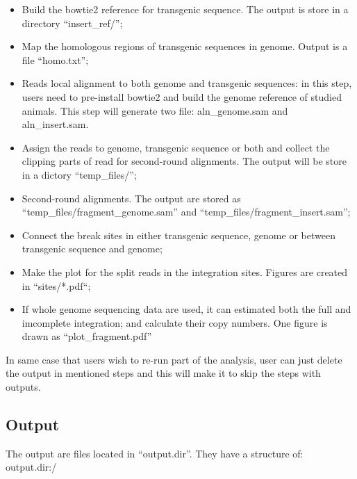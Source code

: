 \documentclass[]{article}
\begin{document}
\begin{itemize}
\item
  Build the bowtie2 reference for transgenic sequence. The output is
  store in a directory ``insert\_ref/'';
\item
  Map the homologous regions of transgenic sequences in genome. Output
  is a file ``homo.txt'';
\item
  Reads local alignment to both genome and transgenic sequences: in this
  step, users need to pre-install bowtie2 and build the genome reference
  of studied animals. This step will generate two file: aln\_genome.sam
  and aln\_insert.sam.
\item
  Assign the reads to genome, transgenic sequence or both and collect
  the clipping parts of read for second-round alignments. The output
  will be store in a dictory ``temp\_files/'';
\item
  Second-round alignments. The output are stored as
  ``temp\_files/fragment\_genome.sam'' and
  ``temp\_files/fragment\_insert.sam'';
\item
  Connect the break sites in either transgenic sequence, genome or
  between transgenic sequence and genome;
\item
  Make the plot for the split reads in the integration sites. Figures
  are created in ``sites/*.pdf``;
\item
  If whole genome sequencing data are used, it can estimated both the
  full and imcomplete integration; and calculate their copy numbers. One
  figure is drawn as ``plot\_fragment.pdf''
\end{itemize}

In same case that users wish to re-run part of the analysis, user can
just delete the output in mentioned steps and this will make it to skip
the steps with outputs.

\subsection{Output}\label{output}

The output are files located in ``output.dir''. They have a structure
of: output.dir:/
\end{document}
